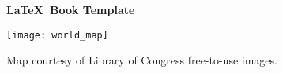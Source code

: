 
\thispagestyle{empty} %
{%
	\Large \raggedright \textbf{\LaTeX\ Book Template}
}
\clearpage

\thispagestyle{empty}

\begin{center}
	\texttt{[image: world\_map]}
\end{center}

\vspace{-3ex}
\hspace{12em} {\footnotesize\textsf{Map courtesy of Library of Congress free-to-use images.}}